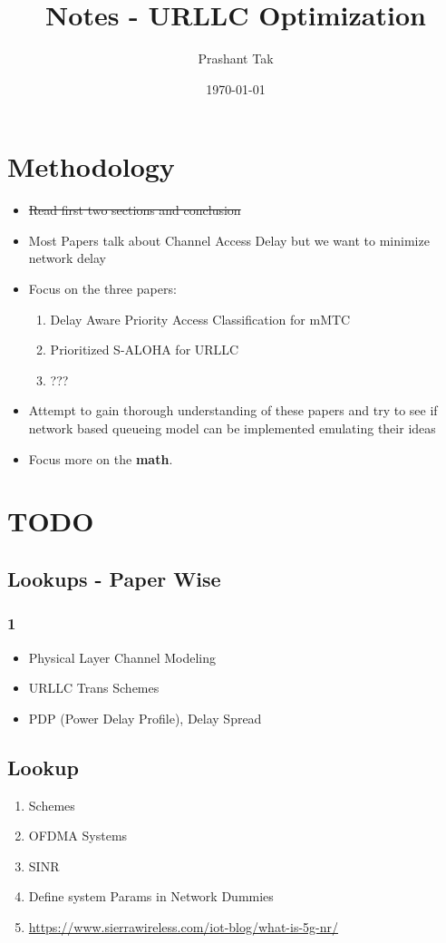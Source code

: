 \documentclass[11pt]{article}
\author{Prashant Tak}
\date{\today}
\title{Notes - URLLC Optimization}
\begin{document}
\maketitle
\tableofcontents \clearpage
\section{Methodology}
\label{sec:orga994fc9}
\begin{itemize}
\item \sout{Read first two sections and conclusion}
\item Most Papers talk about Channel Access Delay but we want to minimize network delay
\item Focus on the three papers:
\begin{enumerate}
\item Delay Aware Priority Access Classification for mMTC
\item Prioritized S-ALOHA for URLLC
\item ???
\end{enumerate}
\item Attempt to gain thorough understanding of these papers and try to see if network based queueing model can be implemented emulating their ideas
\item Focus more on the \textbf{math}.
\end{itemize}
\section{TODO}
\label{sec:org470ce05}
\subsection{Lookups - Paper Wise}
\label{sec:orgb652338}
\subsubsection{1}
\label{sec:orgeee5b1a}
\begin{itemize}
\item Physical Layer Channel Modeling
\item URLLC Trans Schemes
\item PDP (Power Delay Profile), Delay Spread
\end{itemize}
\subsection{Lookup}
\label{sec:orgd194f47}
\begin{enumerate}
\item Schemes
\item OFDMA Systems
\item SINR
\item Define system Params in Network Dummies
\item \url{https://www.sierrawireless.com/iot-blog/what-is-5g-nr/}
\end{enumerate}
\end{document}
